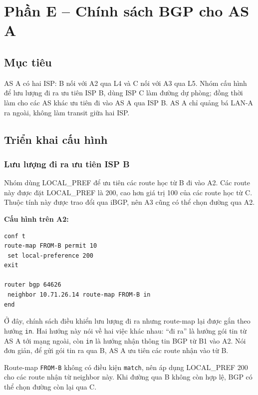 
\section{Phần E -- Chính sách BGP cho AS A}

\subsection{Mục tiêu}

AS A có hai ISP: B nối với A2 qua L4
và C nối với A3 qua L5.
Nhóm cấu hình để lưu lượng đi ra ưu tiên ISP B,
dùng ISP C làm đường dự phòng;
đồng thời làm cho các AS khác ưu tiên
đi vào AS A qua ISP B.
AS A chỉ quảng bá LAN-A ra ngoài,
không làm transit giữa hai ISP.

\subsection{Triển khai cấu hình}

\subsubsection{Lưu lượng đi ra ưu tiên ISP B}

Nhóm dùng LOCAL\_PREF để ưu tiên
các route học từ B đi vào A2.
Các route này được đặt LOCAL\_PREF là 200,
cao hơn giá trị 100 của các route học từ C.
Thuộc tính này được trao đổi qua iBGP,
nên A3 cũng có thể chọn đường qua A2.

\textbf{Cấu hình trên A2:}

\begin{lstlisting}
conf t
route-map FROM-B permit 10
 set local-preference 200
exit

router bgp 64626
 neighbor 10.71.26.14 route-map FROM-B in
end
\end{lstlisting}

Ở đây, chính sách điều khiển lưu lượng
đi ra nhưng route-map lại được gắn theo hướng
\texttt{in}. Hai hướng này nói về hai việc khác nhau:
``đi ra'' là hướng gói tin từ AS A tới mạng ngoài,
còn \texttt{in} là hướng nhận thông tin BGP
từ B1 vào A2.
Nói đơn giản, để gửi gói tin ra qua B,
AS A ưu tiên các route nhận vào từ B.

Route-map \texttt{FROM-B} không có điều kiện
\texttt{match}, nên áp dụng LOCAL\_PREF 200
cho các route nhận từ neighbor này.
Khi đường qua B không còn hợp lệ,
BGP có thể chọn đường còn lại qua C.

